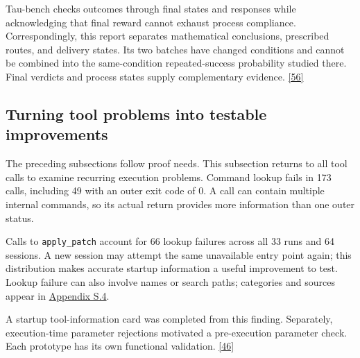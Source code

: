 Tau-bench checks outcomes through final states and responses while acknowledging that final reward cannot exhaust process compliance. Correspondingly, this report separates mathematical conclusions, prescribed routes, and delivery states. Its two batches have changed conditions and cannot be combined into the same-condition repeated-success probability studied there. Final verdicts and process states supply complementary evidence. \hyperlink{ref-56}{\mbox{[56]}}

\subsection[Turning tool problems into testable improvements]{\texorpdfstring{\protect\hypertarget{section-5-6}{}Turning tool problems into testable improvements}{Turning tool problems into testable improvements}}
The preceding subsections follow proof needs. This subsection returns to all tool calls to examine recurring execution problems. Command lookup fails in 173 calls, including 49 with an outer exit code of 0. A call can contain multiple internal commands, so its actual return provides more information than one outer status.

Calls to \nolinkurl{apply_patch} account for 66 lookup failures across all 33 runs and 64 sessions. A new session may attempt the same unavailable entry point again; this distribution makes accurate startup information a useful improvement to test. Lookup failure can also involve names or search paths; categories and sources appear in \href{en-appendix.pdf\#s4}{Appendix S.4}.

A startup tool-information card was completed from this finding. Separately, execution-time parameter rejections motivated a pre-execution parameter check. Each prototype has its own functional validation. \hyperlink{ref-46}{\mbox{[46]}}

